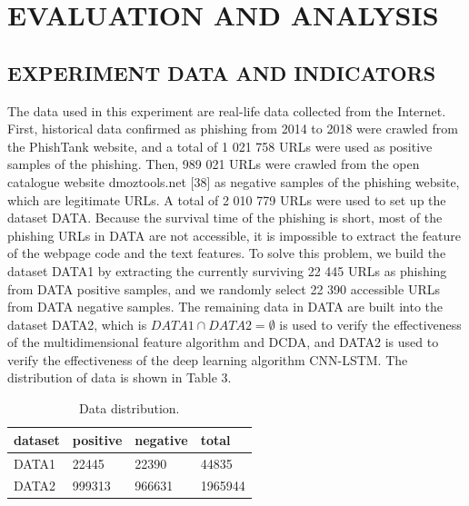 \documentclass{ieeeaccess}
\begin{document}
\section{EVALUATION AND ANALYSIS}
\subsection{EXPERIMENT DATA AND INDICATORS}
The data used in this experiment are real-life data collected
from the Internet. First, historical data confirmed as phishing
from 2014 to 2018 were crawled from the PhishTank website,
and a total of 1 021 758 URLs were used as positive samples
of the phishing. Then, 989 021 URLs were crawled from
the open catalogue website dmoztools.net [38] as negative
samples of the phishing website, which are legitimate URLs.
A total of 2 010 779 URLs were used to set up the dataset
DATA. Because the survival time of the phishing is short,
most of the phishing URLs in DATA are not accessible, it is
impossible to extract the feature of the webpage code and
the text features. To solve this problem, we build the dataset
DATA1 by extracting the currently surviving 22 445 URLs
as phishing from DATA positive samples, and we randomly
select 22 390 accessible URLs from DATA negative samples. The remaining data in DATA are built into the dataset DATA2,
which is $DATA1 \cap DATA2 = \emptyset$ is used to verify
the effectiveness of the multidimensional feature algorithm
and DCDA, and DATA2 is used to verify the effectiveness of
the deep learning algorithm CNN-LSTM. The distribution of
data is shown in Table 3.
\begin{table}[htp]
\caption{Data distribution.}
\label{table:3}
\begin{tabular}{llll}
\hline
dataset & positive & negative & total   \\ \hline
DATA1   & 22445    & 22390    & 44835   \\
DATA2   & 999313   & 966631   & 1965944 \\ \hline
\end{tabular}
\end{table}
\end{document}
